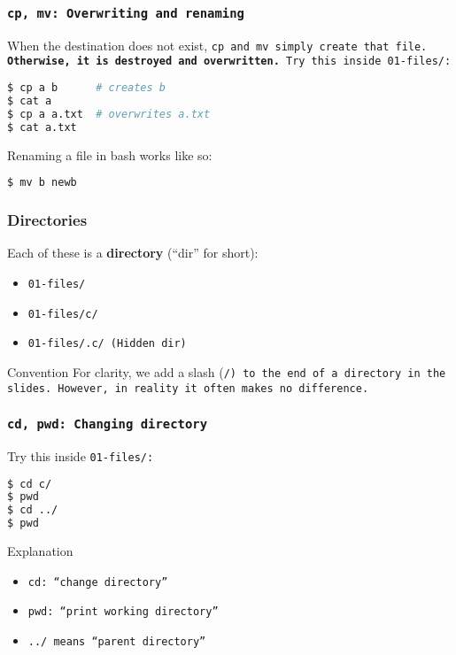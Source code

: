 \begin{frame}[fragile]
\frametitle{\tt{cp, mv}: Overwriting and renaming}
When the destination does not exist, \tt{cp} and \tt{mv} simply create
that file. \textbf{Otherwise, it is destroyed and overwritten.}
\newline \newline
Try this inside \tt{01-files/}:
\begin{lstlisting}[language=bash]
$ cp a b      # creates b
$ cat a
$ cp a a.txt  # overwrites a.txt
$ cat a.txt
\end{lstlisting}

Renaming a file in bash works like so:
\begin{lstlisting}[language=bash]
$ mv b newb
\end{lstlisting}
\end{frame}

\begin{frame}
\frametitle{Directories}
Each of these is a \textbf{directory} (``dir'' for short):
\begin{itemize}
    \item \tt{01-files/}
    \item \tt{01-files/c/}
    \item \tt{01-files/.c/} (Hidden dir)
\end{itemize}

\begin{block}{Convention}
    For clarity, we add a slash (\tt{/}) to the end of a directory in the
    slides. However, in reality it often makes no difference.
\end{block}
\end{frame}

\begin{frame}[fragile]
\frametitle{\tt{cd, pwd}: Changing directory}
Try this inside \tt{01-files/}:
\begin{lstlisting}[language=bash]
$ cd c/
$ pwd
$ cd ../
$ pwd
\end{lstlisting}
\begin{block}{Explanation}
    \begin{itemize}
        \item \tt{cd}: ``change directory''
        \item \tt{pwd}: ``print working directory''
        \item \tt{../} means ``parent directory''
    \end{itemize}
\end{block}
\end{frame}

